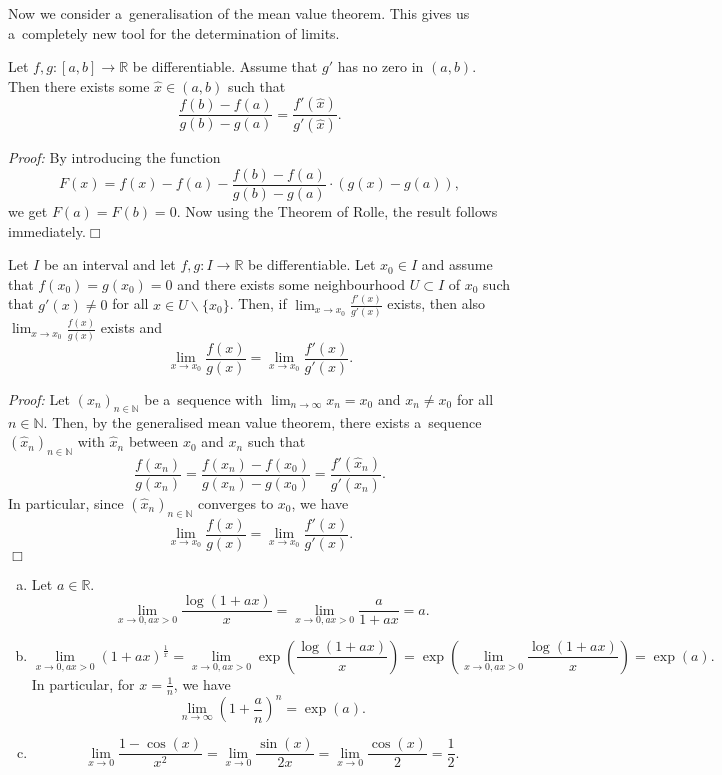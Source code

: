 

Now we consider a~generalisation of the mean value theorem. This gives us a~completely new tool for the determination of limits.
\begin{Theorem}
    Let $f,g:[a,b]\to\mathbb{R}$ be differentiable. Assume that $g'$ has no zero in $(a,b)$. Then there exists some $\hat{x}\in(a,b)$ such that
\[\frac{f(b)-f(a)}{g(b)-g(a)}=\frac{f'(\hat{x})}{g'(\hat{x})}.\]
\end{Theorem}
{\em Proof:}
By introducing the function
\[F(x)=f(x)-f(a)-\frac{f(b)-f(a)}{g(b)-g(a)}\cdot(g(x)-g(a)),\]
we get $F(a)=F(b)=0$. Now using the Theorem of Rolle, the result follows immediately.\hfill$\Box$

\begin{Theorem}
Let $I$ be an interval and let $f,g:I\to\mathbb{R}$ be differentiable. Let $x_0\in I$ and assume that $f(x_0)=g(x_0)=0$ and there exists some neighbourhood $U\subset I$ of $x_0$ such that $g'(x)\neq0$ for all $x\in U\backslash\{x_0\}$. Then, if $\lim_{x\to x_0}\frac{f'(x)}{g'(x)}$ exists, then also $\lim_{x\to x_0}\frac{f(x)}{g(x)}$ exists and
\[\lim_{x\to x_0}\frac{f(x)}{g(x)}=\lim_{x\to x_0}\frac{f'(x)}{g'(x)}.\]
\end{Theorem}
{\em Proof:} Let $(x_n)_{n\in\mathbb{N}}$ be a~sequence with $\lim_{n\to\infty}x_n=x_0$ and $x_n\neq x_0$ for all $n\in\mathbb{N}$. Then, by the generalised mean value theorem, there exists a~sequence $(\hat{x}_n)_{n\in\mathbb{N}}$ with $\hat{x}_n$ between $x_0$ and $x_n$ such that
\[\frac{f(x_n)}{g(x_n)}=\frac{f(x_n)-f(x_0)}{g(x_n)-g(x_0)}=\frac{f'(\hat{x}_n)}{g'(\hat{x}_n)}.\]
In particular, since $(\hat{x}_n)_{n\in\mathbb{N}}$ converges to $x_0$, we have
\[\lim_{x\to x_0}\frac{f(x)}{g(x)}=\lim_{x\to x_0}\frac{f'(x)}{g'(x)}.\]
$\Box$\\

\begin{example}
\begin{enumerate}[a)]
    \item Let $a\in\mathbb{R}$.
\[\lim_{x\to0,ax>0}\frac{\log(1+ax)}x=\lim_{x\to0,ax>0}\frac{a}{1+ax}=a.\]
 \item
\[\lim_{x\to0,ax>0}(1+ax)^{\frac{1}x}=\lim_{x\to0,ax>0}\exp\left(\frac{\log(1+ax)}x\right)=\exp\left(\lim_{x\to0,ax>0}\frac{\log(1+ax)}x\right)=\exp(a).\]
In particular, for $x=\frac1n$, we have
\[\lim_{n\to\infty}\left(1+\frac{a}{n}\right)^{n}=\exp(a).\]
 \item
\[\lim_{x\to0}\frac{1-\cos(x)}{x^2}=\lim_{x\to0}\frac{\sin(x)}{2x}=\lim_{x\to0}\frac{\cos(x)}{2}=\frac12.\]
\end{enumerate}
\end{example}

